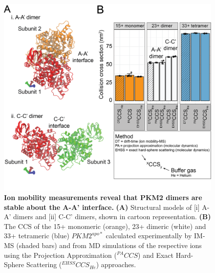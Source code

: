 %
%
%
%
%
\begin{figure}[!ht]
\includegraphics[scale=0.7]{ch5_fig4_dimer_imms.png}
\caption[Ion mobility measurements reveal that PKM2 dimers are stable about the A-A' interface.] {\textbf{Ion mobility measurements reveal that PKM2 dimers are stable about the A-A' interface.} \textbf{(A)} Structural models of [i] A-A' dimers and [ii] C-C' dimers, shown in cartoon representation. \textbf{(B)} The CCS of the 15+ monomeric (orange), 23+ dimeric (white) and 33+ tetrameric (blue) $PKM2^{apo \ast}$ calculated experimentally by IM-MS (shaded bars) and from MD simulations of the respective ions using the Projection Approximation ($^{PA}CCS$) and Exact Hard-Sphere Scattering ($^{EHSS}CCS_{He}$) approaches.}
\label{fig:dimer_imms}
\end{figure}
%
%
\clearpage

